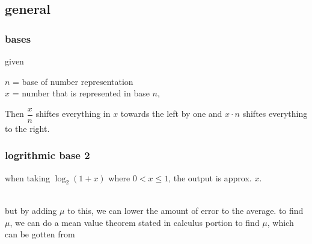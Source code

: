 \documentclass{article} %
\begin{document}
    \subsection{general}
        \subsubsection{bases}
        given  \begin{center}
            $n$ = base of number representation\\
            $x$ = number that is represented in base $n$,
        \end{center}
        Then $\dfrac{x}{n}$ shiftes everything in $x$ towards the left by one and $x\cdot n$ shiftes everything to the right.
        \subsubsection{logrithmic base 2}
        when taking $\log_2(1+x)$ where $0<x \leq1$, the output is approx. $x$.\\
        \\but by adding $\mu$ to this, we can lower the amount of error to the average.
        to find $\mu$, we can do a mean value theorem stated in calculus portion to find $\mu$, which can be gotten from
\end{document}
